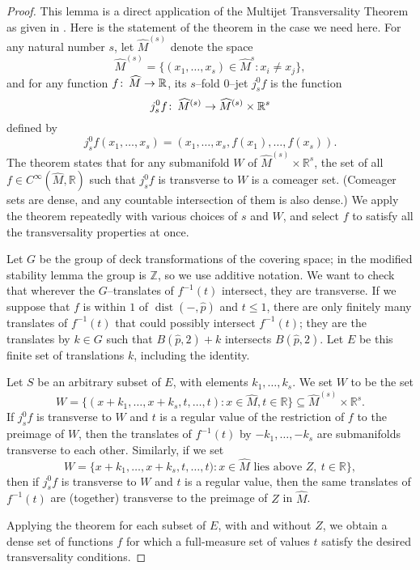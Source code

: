 \documentclass[12pt]{amsart}
\numberwithin{equation}{section}
\begin{document}
\begin{proof}
 This lemma is a direct application of the Multijet Transversality
 Theorem as given in \cite[Chapter II, Theorem 4.13]{Golubitsky74}.  Here is the statement of the theorem in the case we need here.  For any natural number $s$, let $\widehat{M}^{(s)}$ denote the space
\[\widehat{M}^{(s)} = \{(x_1, \ldots, x_s) \in \widehat{M}^s : x_i \neq x_j\},\]
and for any function $f {\colon\thinspace} \widehat{M} \rightarrow \mathbb{R}$, its $s$--fold $0$--jet $j_s^0f$ is the function
\[j_s^0f {\colon\thinspace} \widehat{M}^{(s)} \rightarrow \widehat{M}^{(s)} \times \mathbb{R}^s\]
defined by
\[j_s^0f(x_1, \ldots, x_s) = (x_1, \ldots, x_s, f(x_1), \ldots, f(x_s)).\]
The theorem states that for any submanifold $W$ of $\widehat{M}^{(s)} \times \mathbb{R}^s$, the set of all $f \in C^\infty(\widehat{M}, \mathbb{R})$ such that $j_s^0f$ is transverse to $W$ is a comeager set.  (Comeager sets are dense, and any countable intersection of them is also dense.)  We apply the theorem repeatedly with various choices of $s$ and $W$, and select $f$ to satisfy all the transversality properties at once.

Let $G$ be the group of deck transformations of the covering space; in the modified stability lemma the group is $\mathbb{Z}$, so we use additive notation.  We want to check that wherever the $G$--translates of $f^{-1}(t)$ intersect, they are transverse.  If we suppose that $f$ is within $1$ of $\operatorname{dist}(-, \widehat{p})$ and $t \leq 1$, there are only finitely many translates of $f^{-1}(t)$ that could possibly intersect $f^{-1}(t)$; they are the translates by $k \in G$ such that $B(\widehat{p}, 2) + k$ intersects $B(\widehat{p}, 2)$.  Let $E$ be this finite set of translations $k$, including the identity.

Let $S$ be an arbitrary subset of $E$, with elements $k_1, \ldots, k_s$.  We set $W$ to be the set
\[W = \{(x + k_1, \ldots, x + k_s, t, \ldots, t) : x \in \widehat{M}, t \in \mathbb{R}\} \subseteq \widehat{M}^{(s)} \times \mathbb{R}^s.\]
If $j_s^0f$ is transverse to $W$ and $t$ is a regular value of the restriction of $f$ to the preimage of $W$, then the translates of $f^{-1}(t)$ by $-k_1, \ldots, -k_s$ are submanifolds transverse to each other.  Similarly, if we set 
\[W = \{x + k_1, \ldots, x + k_s, t, \ldots, t) : x \in \widehat{M} \text{ lies above } Z,\  t \in \mathbb{R}\},\]
then if $j_s^0f$ is transverse to $W$ and $t$ is a regular value, then the same translates of $f^{-1}(t)$ are (together) transverse to the preimage of $Z$ in $\widehat{M}$.

Applying the theorem for each subset of $E$, with and without $Z$, we obtain a dense set of functions $f$ for which a full-measure set of values $t$ satisfy the desired transversality conditions.
\end{proof}
\end{document}
